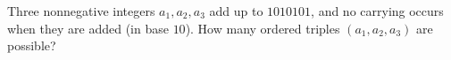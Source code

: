 Three nonnegative integers $a_1,a_2,a_3$ add up to $1010101$, and no carrying occurs when they are added (in base $10$). How many ordered triples $(a_1,a_2,a_3)$ are possible?
